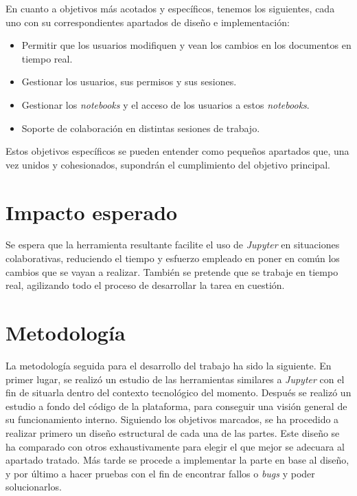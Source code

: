 \documentclass[11pt,spanish,listoffigures]{tfgetsinf}
\begin{document}
En cuanto a objetivos más acotados y específicos, tenemos los siguientes, cada uno con su correspondientes apartados de diseño e implementación:
\begin{itemize}
\item Permitir que los usuarios modifiquen y vean los cambios en los documentos en tiempo real.
\item Gestionar los usuarios, sus permisos y sus sesiones.
\item Gestionar los \textit{notebooks} y el acceso de los usuarios a estos \textit{notebooks}.
\item Soporte de colaboración en distintas sesiones de trabajo.
\end{itemize}

Estos objetivos específicos se pueden entender como pequeños apartados que, una vez unidos y cohesionados, supondrán el cumplimiento del objetivo principal.



\section{Impacto esperado}
\label{sec:impacto}

Se espera que la herramienta resultante facilite el uso de \textit{Jupyter} en situaciones colaborativas, reduciendo el tiempo y esfuerzo empleado en poner en común los cambios que se vayan a realizar. También se pretende que se trabaje en tiempo real, agilizando todo el proceso de desarrollar la tarea en cuestión. 



\section{Metodología}
\label{sec:metodologia}

La metodología seguida para el desarrollo del trabajo ha sido la siguiente. En primer lugar, se realizó un estudio de las herramientas similares a \textit{Jupyter} con el fin de situarla dentro del contexto tecnológico del momento. Después se realizó un estudio a fondo del código de la plataforma, para conseguir una visión general de su funcionamiento interno. Siguiendo los objetivos marcados, se ha procedido a realizar primero un diseño estructural de cada una de las partes. Este diseño se ha comparado con otros exhaustivamente para elegir el que mejor se adecuara al apartado tratado. Más tarde se procede a implementar la parte en base al diseño, y por último a hacer pruebas con el fin de encontrar fallos o \textit{\gls{bug}s} y poder solucionarlos.
\end{document}
